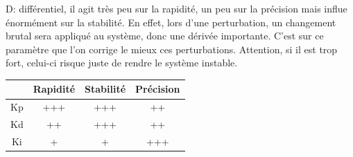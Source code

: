 \documentclass[a4paper]{article}
\begin{document}
	D: différentiel, il agit très peu sur la rapidité, un peu sur la précision mais influe énormément sur la stabilité. En effet, lors d'une perturbation, un changement brutal sera appliqué au système, donc une dérivée importante. C'est sur ce paramètre que l'on corrige le mieux ces perturbations.
	Attention, si il est trop fort, celui-ci risque juste de rendre le système instable.
	
	\begin{center}
		\begin{tabular}{||c|c|c|c||}
			\hline
			 & Rapidité & Stabilité & Précision \\[0.5ex]
			\hline \hline
			Kp & +++ & +++ & ++ \\
			\hline
			Kd & ++ & +++ & ++ \\
			\hline
			Ki & + & + & +++\\
			\hline
		\end{tabular}
	\end{center}
\end{document}
